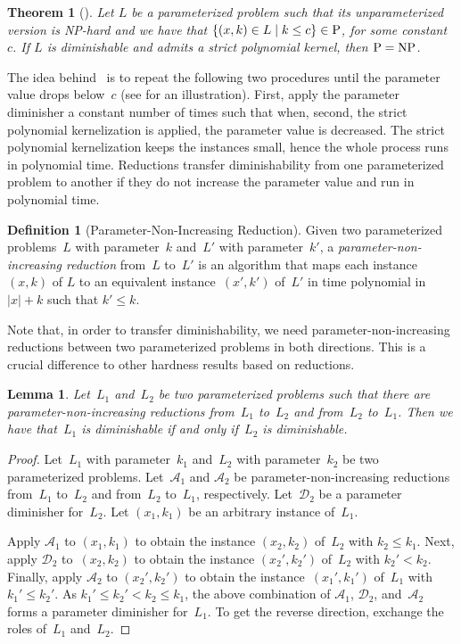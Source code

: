 \documentclass[11pt,a4,USenglish]{article}
\newcommand{\NP}{\textnormal{NP}}
\newcommand{\PTIME}{\textnormal{P}}
\newcommand{\PeqNP}{$\PTIME{}=\NP{}$}
\theoremstyle{definition}
\newtheorem{defi}{Definition}
\theoremstyle{plain}
\newtheorem{lem}{Lemma}
\newtheorem{thm}{Theorem}
\theoremstyle{remark}
\newcommand{\calD}{\mathcal{D}}
\newcommand{\calA}{\mathcal{A}}
\begin{document}
\begin{thm}[\cite{chen2011lower}]
\label{thm:diminisher}%
Let $L$ be a parameterized problem such that its unparameterized version is \NP{}-hard and we have that $\{(x,k)\in L\mid k\le c\}\in \PTIME{}$, for some constant $c$. %
If $L$ is diminishable and admits a strict polynomial kernel, then \PeqNP{}.
\end{thm}

\noindent The idea behind~ is to repeat the following two procedures until the parameter value drops below~$c$ (see  for an illustration). 
First, apply the parameter diminisher a constant number of times such that when, second, the strict polynomial kernelization is applied, the parameter value is decreased. The strict polynomial kernelization keeps the instances small, hence the whole process runs in polynomial time.
%
%
%
%
%
%
%
%
%
%
%
%
%
%
%
%
Reductions transfer diminishability from one parameterized problem to another if they do not increase the parameter value and run in polynomial time.

\begin{defi}[Parameter-Non-Increasing Reduction]
 Given two parameterized problems~$L$ with parameter~$k$ and~$L'$ with parameter~$k'$, a \emph{parameter-non-increasing reduction} from~$L$ to~$L'$ is an algorithm that maps each instance $(x,k)$ of $L$ to an equivalent 
 instance~$(x',k')$ of~$L'$ in time polynomial in $|x|+k$ such that $k'\leq k$.
\end{defi}
%
Note that, in order to transfer diminishability, we need parameter-non-increasing reductions between two parameterized problems in both directions. This is a crucial difference to other hardness results based on reductions.

\begin{lem}%
  \label{lem:dimreduction}
Let~$L_1$ and~$L_2$ be two parameterized problems such that there are parameter-non-increasing reductions from~$L_1$ to~$L_2$ and from~$L_2$ to~$L_1$.
Then we have that~$L_1$ is diminishable if and only if~$L_2$ is diminishable. 
\end{lem}

%
{
  \begin{proof}
    Let~$L_1$ with parameter~$k_1$ and~$L_2$ with parameter~$k_2$ be two parameterized problems.
%
    Let~$\calA_1$ and $\calA_2$ be parameter-non-increasing reductions from~$L_1$ to~$L_2$ and from~$L_2$ to~$L_1$, respectively.
    Let~$\calD_2$ be a parameter diminisher for~$L_2$. 
    Let $(x_1,k_1)$ be an arbitrary instance of~$L_1$.
    
    Apply $\calA_1$ to $(x_1,k_1)$ to obtain the instance $(x_2,k_2)$ of~$L_2$ with $k_2\leq k_1$.
    Next, apply $\calD_2$ to~$(x_2,k_2)$ to obtain the instance $(x_2',k_2')$ of~$L_2$ with $k_2'<k_2$.
    Finally, apply $\calA_2$ to $(x_2',k_2')$ to obtain the instance~$(x_1',k_1')$ of~$L_1$ with $k_1'\leq k_2'$.
    As $k_1'\leq k_2'<k_2 \leq k_1$, the above combination of $\calA_1$, $\calD_2$, and~$\calA_2$ forms a parameter diminisher for~$L_1$.
    To get the reverse direction, exchange the roles of~$L_1$ and~$L_2$.
  \end{proof}
}
\end{document}
